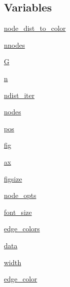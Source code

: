 \subsection*{Variables}
\begin{DoxyCompactItemize}
\item 
\hyperlink{namespaceplot__rainbow__coloring_ac377f80deeb156a4c71d5e3131be580e}{node\+\_\+dist\+\_\+to\+\_\+color}
\item 
\hyperlink{namespaceplot__rainbow__coloring_a20e77b78db1a4139765dceac74ca540e}{nnodes}
\item 
\hyperlink{namespaceplot__rainbow__coloring_a5d928e55e3563566c98f207004e7ff33}{G}
\item 
\hyperlink{namespaceplot__rainbow__coloring_af616ef90805ed9418fa18a27c32f8be6}{n}
\item 
\hyperlink{namespaceplot__rainbow__coloring_a40c9603ac6c9348b4b1689fda92308b0}{ndist\+\_\+iter}
\item 
\hyperlink{namespaceplot__rainbow__coloring_a3efcc69beb7031e330d68f5382289a96}{nodes}
\item 
\hyperlink{namespaceplot__rainbow__coloring_aaaf28b5b38706a510f1ccf8f0fe5ecc8}{pos}
\item 
\hyperlink{namespaceplot__rainbow__coloring_add78b5280ca77213daecd8687ce48a3a}{fig}
\item 
\hyperlink{namespaceplot__rainbow__coloring_aaae8a744ac5c90e6b46a1ab9df4750cb}{ax}
\item 
\hyperlink{namespaceplot__rainbow__coloring_ab32846c945cac407dba8b9ee87ba5db6}{figsize}
\item 
\hyperlink{namespaceplot__rainbow__coloring_a1f5c291d41dbc04223e25daee3ed24c1}{node\+\_\+opts}
\item 
\hyperlink{namespaceplot__rainbow__coloring_a15a36dfaab40a4d9380b47c1195f59a3}{font\+\_\+size}
\item 
\hyperlink{namespaceplot__rainbow__coloring_a045be44afc73ca5d5896ac0279746f24}{edge\+\_\+colors}
\item 
\hyperlink{namespaceplot__rainbow__coloring_a60edfa205fd4e92e6de4228484c6414e}{data}
\item 
\hyperlink{namespaceplot__rainbow__coloring_a041810854bdc5e6f91652b4c982c2df0}{width}
\item 
\hyperlink{namespaceplot__rainbow__coloring_a4480b701daf885dc29fd305ae8cabfc7}{edge\+\_\+color}
\end{DoxyCompactItemize}


